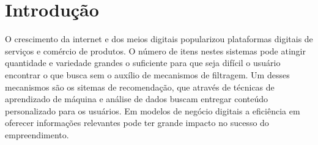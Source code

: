 \documentclass[
	12pt,				%
    oneside,			%
	a4paper,			%
	english,			%
	french,				%
	spanish,			%
	brazil,				%
	]{abntex2}
\begin{document}

\cleardoublepage %


\cleardoublepage




\tableofcontents*


\textual


\chapter{Introdução} %

O crescimento da internet e dos meios digitais popularizou plataformas digitais de serviços e comércio de produtos.
O número de itens nestes sistemas pode atingir quantidade e variedade grandes o suficiente para que seja difícil o usuário 
encontrar o que busca sem o auxílio de mecanismos de filtragem. Um desses mecanismos são os sitemas de recomendação, que através de técnicas
de aprendizado de máquina e análise de dados buscam entregar conteúdo personalizado para os usuários. Em modelos de negócio digitais a eficiência em 
oferecer informações relevantes pode ter grande impacto no sucesso do empreendimento.
\end{document}
